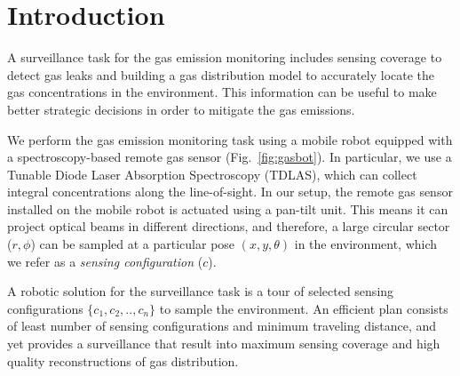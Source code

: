 \section{Introduction}
\label{sec:intro}


A surveillance task for the gas emission monitoring includes sensing coverage to detect gas leaks and building a gas distribution model to accurately locate the gas concentrations in the environment. This information can be useful to make better strategic decisions in order to mitigate the gas emissions.



We perform the gas emission monitoring task using a mobile robot equipped with a spectroscopy-based remote gas sensor (Fig.~\ref{fig:gasbot}). 
In particular, we use a Tunable Diode Laser Absorption Spectroscopy (TDLAS), which can collect integral concentrations along the line-of-sight.
In our setup, the remote gas sensor installed on the mobile robot is actuated using a pan-tilt unit.
This means it can project optical beams in different directions, and therefore, a large circular sector ($r,\phi$) can be sampled at a particular pose $(x,y,\theta)$ in the environment, which we refer as a \textit{sensing configuration} ($c$). 





A robotic solution for the surveillance task is a tour of selected sensing configurations $\{c_1,c_2,..,c_n\}$ to sample the environment. An efficient plan consists of least number of sensing configurations and minimum traveling distance, and yet provides a surveillance that result into maximum sensing coverage and high quality reconstructions of gas distribution. %


